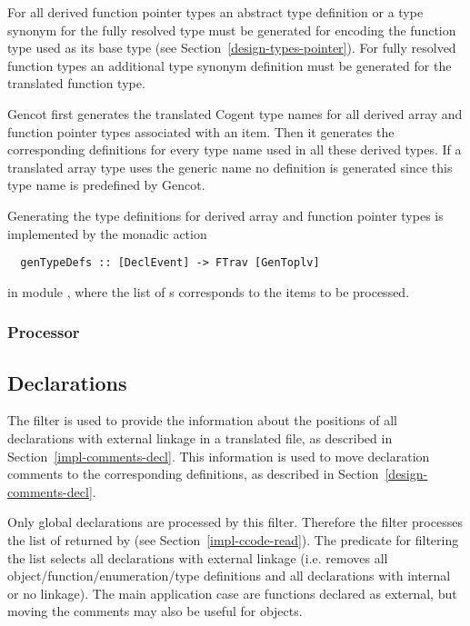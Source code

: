 For all derived function pointer types an abstract type definition or a type synonym for the fully resolved type 
must be generated for encoding the function type used as its base type (see Section~\ref{design-types-pointer}).
For fully resolved function types an additional type synonym definition must be generated for the translated function type.

Gencot first generates the translated Cogent type names for all derived array and function pointer types associated 
with an item. Then it generates the corresponding definitions for every type name
used in all these derived types. If a translated array type uses the generic name  no definition
is generated since this type name is predefined by Gencot.

Generating the type definitions for derived array and function pointer types is implemented by the monadic action
\begin{verbatim}
  genTypeDefs :: [DeclEvent] -> FTrav [GenToplv]
\end{verbatim}
in module , where the list of s corresponds to the items
to be processed.

\subsubsection{Processor }

\subsection{Declarations}
\label{impl-ccomps-decls}

The filter  is used to provide the information about the positions of all declarations with
external linkage in
a translated file, as described in Section~\ref{impl-comments-decl}. This information is used to move declaration
comments to the corresponding definitions, as described in Section~\ref{design-comments-decl}.

Only global declarations are processed by this filter. Therefore the filter processes the list of 
returned by  (see Section~\ref{impl-ccode-read}). The predicate for filtering the list
selects all declarations with external linkage (i.e. removes all object/function/enumeration/type definitions and 
all declarations with internal or no linkage). 
The main application case are functions declared as external, but moving the comments may also be useful for 
objects.

